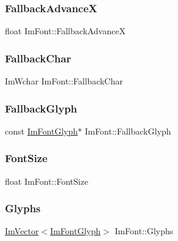 \hypertarget{struct_im_font_ad58a5ee4492a3a9fa56f73e5a40d728d}{}\label{struct_im_font_ad58a5ee4492a3a9fa56f73e5a40d728d} 
\subsubsection{\texorpdfstring{Fallback\+AdvanceX}{FallbackAdvanceX}}
{\footnotesize\ttfamily float Im\+Font\+::\+Fallback\+AdvanceX}

\hypertarget{struct_im_font_ae54c2c4184bfcbc7b8f6da9cbc4f93c0}{}\label{struct_im_font_ae54c2c4184bfcbc7b8f6da9cbc4f93c0} 
\subsubsection{\texorpdfstring{Fallback\+Char}{FallbackChar}}
{\footnotesize\ttfamily Im\+Wchar Im\+Font\+::\+Fallback\+Char}

\hypertarget{struct_im_font_a0e666b0c49646bd294103f4d288df4b8}{}\label{struct_im_font_a0e666b0c49646bd294103f4d288df4b8} 
\subsubsection{\texorpdfstring{Fallback\+Glyph}{FallbackGlyph}}
{\footnotesize\ttfamily const \hyperlink{struct_im_font_glyph}{Im\+Font\+Glyph}$\ast$ Im\+Font\+::\+Fallback\+Glyph}

\hypertarget{struct_im_font_a423e36d1594281f1a5a537e5b0d0a3d4}{}\label{struct_im_font_a423e36d1594281f1a5a537e5b0d0a3d4} 
\subsubsection{\texorpdfstring{Font\+Size}{FontSize}}
{\footnotesize\ttfamily float Im\+Font\+::\+Font\+Size}

\hypertarget{struct_im_font_a1a0901fc1a8cbd41d582d6cef4946bc9}{}\label{struct_im_font_a1a0901fc1a8cbd41d582d6cef4946bc9} 
\subsubsection{\texorpdfstring{Glyphs}{Glyphs}}
{\footnotesize\ttfamily \hyperlink{class_im_vector}{Im\+Vector}$<$\hyperlink{struct_im_font_glyph}{Im\+Font\+Glyph}$>$ Im\+Font\+::\+Glyphs}

